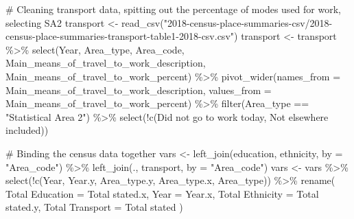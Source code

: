 \documentclass[
  letterpaper,
  DIV=11,
  numbers=noendperiod,
  oneside]{scrartcl}
\newenvironment{Shaded}{\begin{snugshade}}{\end{snugshade}}
\newcommand{\AttributeTok}[1]{\textcolor[rgb]{0.40,0.45,0.13}{#1}}
\newcommand{\CommentTok}[1]{\textcolor[rgb]{0.37,0.37,0.37}{#1}}
\newcommand{\FunctionTok}[1]{\textcolor[rgb]{0.28,0.35,0.67}{#1}}
\newcommand{\NormalTok}[1]{\textcolor[rgb]{0.00,0.23,0.31}{#1}}
\newcommand{\OtherTok}[1]{\textcolor[rgb]{0.00,0.23,0.31}{#1}}
\newcommand{\SpecialCharTok}[1]{\textcolor[rgb]{0.37,0.37,0.37}{#1}}
\newcommand{\StringTok}[1]{\textcolor[rgb]{0.13,0.47,0.30}{#1}}
\begin{document}
\begin{Shaded}
\begin{Highlighting}[]
\CommentTok{\# Cleaning transport data, spitting out the percentage of modes used for work, selecting SA2}
\NormalTok{transport }\OtherTok{\textless{}{-}} \FunctionTok{read\_csv}\NormalTok{(}\StringTok{"2018{-}census{-}place{-}summaries{-}csv/2018{-}census{-}place{-}summaries{-}transport{-}table1{-}2018{-}csv.csv"}\NormalTok{)}
\NormalTok{transport }\OtherTok{\textless{}{-}}\NormalTok{ transport }\SpecialCharTok{\%\textgreater{}\%}
  \FunctionTok{select}\NormalTok{(Year, Area\_type, Area\_code, }\StringTok{\textasciigrave{}}\AttributeTok{Main\_means\_of\_travel\_to\_work\_description}\StringTok{\textasciigrave{}}\NormalTok{, }\StringTok{\textasciigrave{}}\AttributeTok{Main\_means\_of\_travel\_to\_work\_percent}\StringTok{\textasciigrave{}}\NormalTok{) }\SpecialCharTok{\%\textgreater{}\%}
  \FunctionTok{pivot\_wider}\NormalTok{(}\AttributeTok{names\_from =} \StringTok{\textasciigrave{}}\AttributeTok{Main\_means\_of\_travel\_to\_work\_description}\StringTok{\textasciigrave{}}\NormalTok{, }\AttributeTok{values\_from =} \StringTok{\textasciigrave{}}\AttributeTok{Main\_means\_of\_travel\_to\_work\_percent}\StringTok{\textasciigrave{}}\NormalTok{) }\SpecialCharTok{\%\textgreater{}\%}
  \FunctionTok{filter}\NormalTok{(Area\_type }\SpecialCharTok{==} \StringTok{"Statistical Area 2"}\NormalTok{) }\SpecialCharTok{\%\textgreater{}\%}
  \FunctionTok{select}\NormalTok{(}\SpecialCharTok{!}\FunctionTok{c}\NormalTok{(}\StringTok{\textasciigrave{}}\AttributeTok{Did not go to work today}\StringTok{\textasciigrave{}}\NormalTok{, }\StringTok{\textasciigrave{}}\AttributeTok{Not elsewhere included}\StringTok{\textasciigrave{}}\NormalTok{))}

\CommentTok{\# Binding the census data together}
\NormalTok{vars }\OtherTok{\textless{}{-}} \FunctionTok{left\_join}\NormalTok{(education, ethnicity, }\AttributeTok{by =} \StringTok{"Area\_code"}\NormalTok{) }\SpecialCharTok{\%\textgreater{}\%}
  \FunctionTok{left\_join}\NormalTok{(., transport, }\AttributeTok{by =} \StringTok{"Area\_code"}\NormalTok{)}
\NormalTok{vars }\OtherTok{\textless{}{-}}\NormalTok{ vars }\SpecialCharTok{\%\textgreater{}\%}
  \FunctionTok{select}\NormalTok{(}\SpecialCharTok{!}\FunctionTok{c}\NormalTok{(Year, Year.y, Area\_type.y, Area\_type.x, Area\_type)) }\SpecialCharTok{\%\textgreater{}\%}
  \FunctionTok{rename}\NormalTok{(}
    \StringTok{\textasciigrave{}}\AttributeTok{Total Education}\StringTok{\textasciigrave{}} \OtherTok{=} \StringTok{\textasciigrave{}}\AttributeTok{Total stated.x}\StringTok{\textasciigrave{}}\NormalTok{,}
    \StringTok{\textasciigrave{}}\AttributeTok{Year}\StringTok{\textasciigrave{}} \OtherTok{=}\NormalTok{ Year.x,}
    \StringTok{\textasciigrave{}}\AttributeTok{Total Ethnicity}\StringTok{\textasciigrave{}} \OtherTok{=} \StringTok{\textasciigrave{}}\AttributeTok{Total stated.y}\StringTok{\textasciigrave{}}\NormalTok{,}
    \StringTok{\textasciigrave{}}\AttributeTok{Total Transport}\StringTok{\textasciigrave{}} \OtherTok{=} \StringTok{\textasciigrave{}}\AttributeTok{Total stated}\StringTok{\textasciigrave{}}
\NormalTok{  )}


\end{Highlighting}
\end{Shaded}
\end{document}
